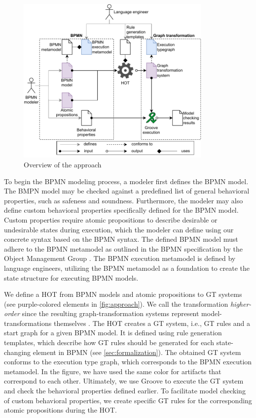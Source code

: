 \documentclass{lmcs} %
\begin{document}
\begin{figure}[ht]
    \centering
    \includegraphics[width=0.85\textwidth]{images/bpmn_semantics-overview.pdf}
    \caption{Overview of the approach}
    \label{fig:approach}
\end{figure}

To begin the BPMN modeling process, a modeler first defines the BPMN model. 
The BMPN model may be checked against a predefined list of general behavioral properties, such as safeness and soundness.
Furthermore, the modeler may also define custom behavioral properties specifically defined for the BPMN model.
Custom properties require atomic propositions to describe desirable or undesirable states during execution, which the modeler can define using our concrete syntax based on the BPMN syntax.
The defined BPMN model must adhere to the BPMN metamodel as outlined in the BPMN specification by the Object Management Group \cite{objectmanagementgroupBusinessProcessModel2013}.
The BPMN execution metamodel is defined by language engineers, utilizing the BPMN metamodel as a foundation to create the state structure for executing BPMN models. 

We define a HOT from BPMN models and atomic propositions to GT systems (see purple-colored elements in \autoref{fig:approach}).
We call the transformation \textit{higher-order} since the resulting graph-transformation systems represent model-transformations themselves \cite{tisiUseHigherOrderModel2009}.
The HOT creates a GT system, i.e., GT rules and a start graph for a given BPMN model.
It is defined using rule generation templates, which describe how GT rules should be generated for each state-changing element in BPMN (see \autoref{sec:formalization}).
The obtained GT system conforms to the execution type graph, which corresponds to the BPMN execution metamodel.
In the figure, we have used the same color for artifacts that correspond to each other.
Ultimately, we use Groove to execute the GT system and check the behavioral properties defined earlier.
To facilitate model checking of custom behavioral properties, we create specific GT rules for the corresponding atomic propositions during the HOT.
\end{document}
